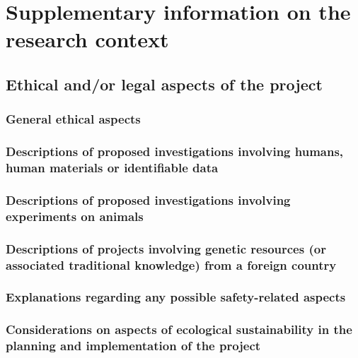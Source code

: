 \documentclass{scrartcl}
\begin{document}
\printbibliography[heading=none]

\clearpage
\renewcommand{\maxpage}{8}
\setcounter{page}{1}

\section{Supplementary information on the research context}

\subsection{Ethical and/or legal aspects of the project}

\subsubsection{General ethical aspects}

\subsubsection{Descriptions of proposed investigations involving humans, human materials or identifiable data}

\subsubsection{Descriptions of proposed investigations involving experiments on animals}

\subsubsection{Descriptions of projects involving genetic resources (or associated traditional knowledge) from a foreign country}

\subsubsection{Explanations regarding any possible safety-related aspects}



\subsubsection{Considerations on aspects of ecological sustainability in the planning and implementation of the project}
\end{document}
